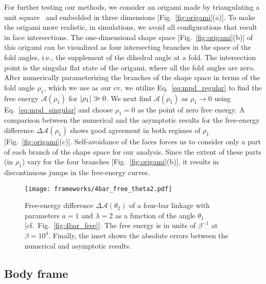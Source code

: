 For further testing our methods, we consider an origami made by triangulating a unit square~\cite{chen2018} and embedded in three dimensions [Fig.~\ref{fig:origami}(a)].
To make the origami more realistic, in simulations, we avoid all configurations that result in face intersections.
The one-dimensional shape space [Fig.~\ref{fig:origami}(b)] of this origami can be visualized as four intersecting branches in the space of the fold angles, i.e., the supplement of the dihedral angle at a fold.
The intersection point is the singular flat state of the origami, where all the fold angles are zero.
After numerically parameterizing the branches of the shape space in terms of the fold angle $\rho_{1}$, which we use as our \ac{cv}, we utilize Eq.~\eqref{eq:mpd_regular} to find the free energy $\mathscr{A}(\rho_{1})$ for $\lvert\rho_{1}\rvert \gg 0$.
We next find $\mathscr{A}(\rho_{1})$ as $\rho_{1} \to 0$ using Eq.~\eqref{eq:mpd_singular} and choose $\rho_{1}=0$ as the point of zero free energy.
A comparison between the numerical and the asymptotic results for the free-energy difference  $\Delta\mathscr{A}(\rho_{1})$ shows good agreement in both regimes of $\rho_{1}$ [Fig.~\ref{fig:origami}(c)].
Self-avoidance of the faces forces us to consider only a part of each branch of the shape space for our analysis.
Since the extent of these parts (in $\rho_{1}$) vary for the four branches [Fig.~\ref{fig:origami}(b)], it results in discontinuous jumps in the free-energy curves.
%
\begin{figure}
  \begin{center}
    \texttt{[image: frameworks/4bar\_free\_theta2.pdf]}
  \end{center}
  \caption{Free-energy difference $\Delta\mathscr{A}(\theta_2)$ of a four-bar linkage with parameters $a=1$ and $\lambda=2$ as a function of the angle $\theta_{1}$ [cf.~Fig.~\ref{fig:4bar_free}].
  The free energy is in units of $\beta^{-1}$ at $\beta = 10^{4}$.
  Finally, the inset shows the absolute errors between the numerical and asymptotic results.
  \label{fig:4bar_q2}
}
\end{figure}


\subsection{Body frame}

